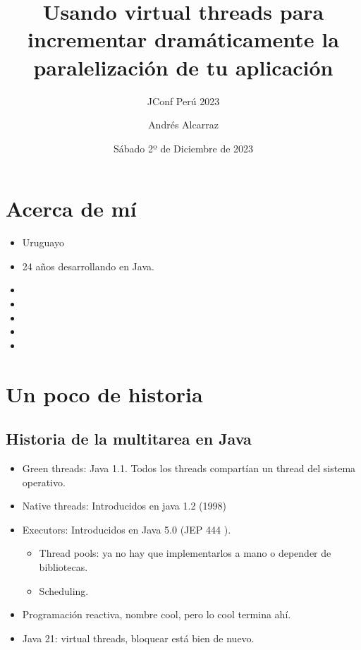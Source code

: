 \documentclass{presentacion}
\title[Virtual Threads] 
{Usando virtual threads para incrementar dramáticamente la paralelización de tu aplicación }
\subtitle{JConf Perú 2023}
\author{Andrés Alcarraz}
\date{Sábado 2º de Diciembre de 2023}
\begin{document}
\frame{\titlepage}

\section{Acerca de mí}
\begin{frame}
    \begin{itemize}
        \item Uruguayo 
        \item 24 años desarrollando en Java.
        \item     {}
        \item {}
        \item {}
        \item {}
        \item {}
        
    \end{itemize}
\end{frame}

\section{Un poco de historia}

\subsection{Historia de la multitarea en Java}
\begin{frame}
 \begin{itemize}[<+->]
  \item Green threads: Java 1.1. Todos los threads compartían un thread del sistema operativo. \cite{JavadocExecutor}
  \item  Native threads:  Introducidos en java 1.2 (1998)
  \item Executors: Introducidos en Java 5.0 (JEP 444 \cite{JEP444}).
  \begin{itemize}
   \item Thread pools: ya no hay que implementarlos a mano o depender de bibliotecas.
   \item Scheduling.
  \end{itemize}
  \item Programación reactiva, nombre cool, pero lo cool termina ahí.
  \item Java 21: virtual threads, bloquear está bien de nuevo.
  
 \end{itemize}

\end{frame}
\end{document}
